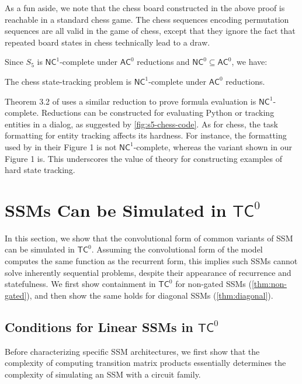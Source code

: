 As a fun aside, we note that the chess board constructed in the above proof is reachable in a standard chess game. The chess sequences encoding permutation sequences are all valid in the game of chess, except that they ignore the fact that repeated board states in chess technically lead to a draw.

Since $S_5$ is $\mathsf{NC}^1$-complete under $\mathsf{AC}^0$ reductions and $\mathsf{NC}^0 \subseteq \mathsf{AC}^0$, we have:

\begin{corollary}
    The chess state-tracking problem is $\mathsf{NC}^1$-complete under $\mathsf{AC}^0$ reductions.
\end{corollary}

Theorem 3.2 of \citet{feng2023towards} uses a similar reduction to prove formula evaluation is $\mathsf{NC}^1$-complete.
Reductions can be constructed for evaluating Python or tracking entities in a dialog, as suggested by \ref{fig:s5-chess-code}.
As for chess, the task formatting for entity tracking affects its hardness. For instance, the formatting used by \citet{kim-schuster-2023-entity} in their Figure 1 is not $\mathsf{NC}^1$-complete, whereas the variant shown in our Figure 1 is. This underscores the value of theory for constructing examples of hard state tracking.

\section{SSMs Can be Simulated in $\mathsf{TC}^0$}

In this section, we show that the convolutional form of common variants of SSM can be simulated in $\mathsf{TC}^0$. Assuming the convolutional form of the model computes the same function as the recurrent form, this implies such SSMs cannot solve inherently sequential problems, despite their appearance of recurrence and statefulness. We first show containment in $\mathsf{TC}^0$ for non-gated SSMs (\ref{thm:non-gated}), and then show the same holds for diagonal SSMs (\ref{thm:diagonal}).

\subsection{Conditions for Linear SSMs in $\mathsf{TC}^0$}

Before characterizing specific SSM architectures, we first show that the complexity of computing transition matrix products essentially determines the complexity of simulating an SSM with a circuit family.

